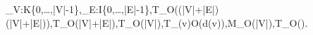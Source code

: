 \iota_V:K\leftrightarrow\{0,\ldots,|V|-1\},\qquad \iota_E:I\leftrightarrow\{0,\ldots,|E|-1\},\qquad T_{}\in O((|V|+|E|)\log(|V|+|E|)),\qquad T_{}\in O(|V|+|E|),\qquad T_{}\in O(\log|V|),\qquad T_{}(v)\in O(d(v)),\qquad M_{}\in O(|V|),\qquad T_{}\in O(\ell).

